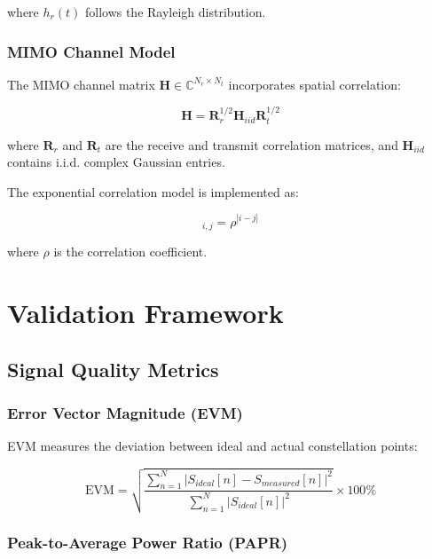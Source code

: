\documentclass[conference]{IEEEtran}
\begin{document}
where $h_r(t)$ follows the Rayleigh distribution.

\subsubsection{MIMO Channel Model}

The MIMO channel matrix $\mathbf{H} \in \mathbb{C}^{N_r \times N_t}$ incorporates spatial correlation:

\begin{equation}
\mathbf{H} = \mathbf{R}_r^{1/2} \mathbf{H}_{iid} \mathbf{R}_t^{1/2}
\label{eq:mimo_channel}
\end{equation}

where $\mathbf{R}_r$ and $\mathbf{R}_t$ are the receive and transmit correlation matrices, and $\mathbf{H}_{iid}$ contains i.i.d. complex Gaussian entries.

The exponential correlation model is implemented as:

\begin{equation}
[\mathbf{R}]_{i,j} = \rho^{|i-j|}
\label{eq:exponential_correlation}
\end{equation}

where $\rho$ is the correlation coefficient.

\section{Validation Framework}
\label{sec:validation}

\subsection{Signal Quality Metrics}

\subsubsection{Error Vector Magnitude (EVM)}

EVM measures the deviation between ideal and actual constellation points:

\begin{equation}
\text{EVM} = \sqrt{\frac{\sum_{n=1}^{N} |S_{ideal}[n] - S_{measured}[n]|^2}{\sum_{n=1}^{N} |S_{ideal}[n]|^2}} \times 100\%
\label{eq:evm}
\end{equation}

\subsubsection{Peak-to-Average Power Ratio (PAPR)}
\end{document}
